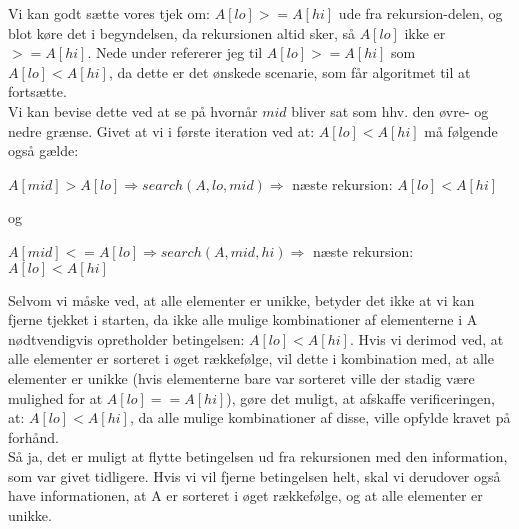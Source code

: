 \documentclass[a4paper,12pt]{article}
\begin{document}
Vi kan godt sætte vores tjek om: $A[lo] >= A[hi]$ ude fra rekursion-delen, og blot køre det i begyndelsen, da rekursionen altid sker, så $A[lo]$ ikke er $>= A[hi]$. Nede under refererer jeg til $A[lo] >= A[hi]$ som $A[lo] < A[hi]$, da dette er det ønskede scenarie, som får algoritmet til at fortsætte.\\
Vi kan bevise dette ved at se på hvornår $mid$ bliver sat som hhv. den øvre- og nedre grænse.
Givet at vi i første iteration ved at: $A[lo] < A[hi]$ må følgende også gælde:
\begin{center}
    $A[mid] > A[lo] \Rightarrow search(A, lo, mid) \Rightarrow$ næste rekursion: $A[lo] < A[hi]$
\end{center}
og
\begin{center}
    $A[mid] <= A[lo] \Rightarrow search(A, mid, hi) \Rightarrow$ næste rekursion: $A[lo] < A[hi]$ 
\end{center}
Selvom vi måske ved, at alle elementer er unikke, betyder det ikke at vi kan fjerne tjekket i starten, da ikke alle mulige kombinationer af elementerne i A nødtvendigvis opretholder betingelsen: $A[lo] < A[hi]$. Hvis vi derimod ved, at alle elementer er sorteret i øget rækkefølge, vil dette i kombination med, at alle elementer er unikke (hvis elementerne bare var sorteret ville der stadig være mulighed for at $A[lo] == A[hi]$), gøre det muligt, at afskaffe verificeringen, at: $A[lo] < A[hi]$, da alle mulige kombinationer af disse, ville opfylde kravet på forhånd.\\
Så ja, det er muligt at flytte betingelsen ud fra rekursionen med den information, som var givet tidligere. Hvis vi vil fjerne betingelsen helt, skal vi derudover også have informationen, at A er sorteret i øget rækkefølge, og at alle elementer er unikke.
\end{document}
